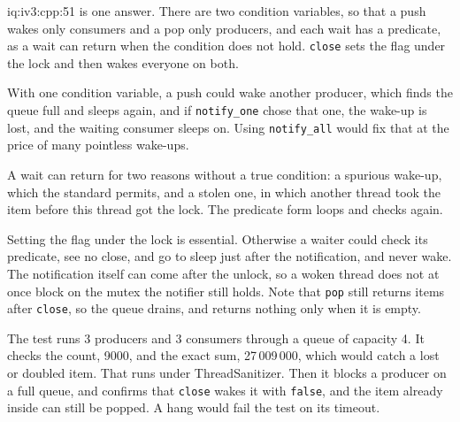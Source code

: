 \begin{solution}{iq:iv3:cpp:51}
 is one answer. There are two condition variables, so that a push wakes only consumers and a pop only producers, and each wait has a predicate, as a wait can return when the condition does not hold. \texttt{close} sets the flag under the lock and then wakes everyone on both.
\label{lst:iv3:cp:bq}

With one condition variable, a push could wake another producer, which finds the queue full and sleeps again, and if \texttt{notify\_one} chose that one, the wake-up is lost, and the waiting consumer sleeps on. Using \texttt{notify\_all} would fix that at the price of many pointless wake-ups.

A wait can return for two reasons without a true condition: a spurious wake-up, which the standard permits, and a stolen one, in which another thread took the item before this thread got the lock. The predicate form loops and checks again.

Setting the flag under the lock is essential. Otherwise a waiter could check its predicate, see no close, and go to sleep just after the notification, and never wake. The notification itself can come after the unlock, so a woken thread does not at once block on the mutex the notifier still holds. Note that \texttt{pop} still returns items after \texttt{close}, so the queue drains, and returns nothing only when it is empty.

The test runs 3 producers and 3 consumers through a queue of capacity 4. It checks the count, 9000, and the exact sum, 27\,009\,000, which would catch a lost or doubled item. That runs under ThreadSanitizer. Then it blocks a producer on a full queue, and confirms that \texttt{close} wakes it with \texttt{false}, and the item already inside can still be popped. A hang would fail the test on its timeout.

\end{solution}

